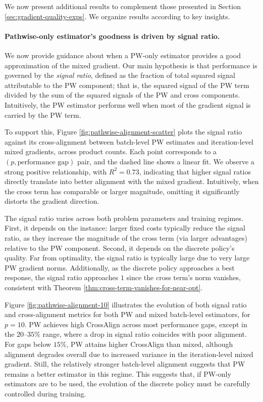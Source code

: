 \documentclass{article}
\theoremstyle{definition}
\theoremstyle{remark}
\begin{document}
We now present additional results to complement those presented in Section \ref{sec:gradient-quality-exps}. We organize results according to key insights.


\paragraph{Pathwise-only estimator's goodness is driven by signal ratio.}

We now provide guidance about when a PW-only estimator provides a good approximation of the mixed gradient. Our main hypothesis is that performance is governed by the \emph{signal ratio}, defined as the fraction of total squared signal attributable to the PW component; that is, the squared signal of the PW term divided by the sum of the squared signals of the PW and cross components. Intuitively, the PW estimator performs well when most of the gradient signal is carried by the PW term.

To support this, Figure \ref{fig:pathwise-alignment-scatter} plots the signal ratio against its cross-alignment between batch-level PW estimates and iteration-level mixed gradients, across product counts. Each point corresponds to a $(p,\text{performance gap})$ pair, and the dashed line shows a linear fit. We observe a strong positive relationship, with $R^2 = 0.73$, indicating that higher signal ratios directly translate into better alignment with the mixed gradient. Intuitively, when the cross term has comparable or larger magnitude, omitting it significantly distorts the gradient direction.

The signal ratio varies across both problem parameters and training regimes. First, it depends on the instance: larger fixed costs typically reduce the signal ratio, as they increase the magnitude of the cross term (via larger advantages) relative to the PW component. Second, it depends on the discrete policy's quality. Far from optimality, the signal ratio is typically large due to very large PW gradient norms. Additionally, as the discrete policy approaches a best response, the signal ratio approaches $1$ since the cross term's norm vanishes, consistent with Theorem \ref{thm:cross-term-vanishes-for-near-opt}.

Figure \ref{fig:pathwise-alignment-10} illustrates the evolution of both signal ratio and cross-alignment metrics for both PW and mixed batch-level estimators, for $p=10$. PW achieves high CrossAlign across most performance gaps, except in the $20$–$35\%$ range, where a drop in signal ratio coincides with poor alignment. For gaps below $15\%$, PW attains higher CrossAlign than mixed, although alignment degrades overall due to increased variance in the iteration-level mixed gradient. Still, the relatively stronger batch-level alignment suggests that PW remains a better estimator in this regime. This suggests that, if PW-only estimators are to be used, the evolution of the discrete policy must be carefully controlled during training.
\end{document}
